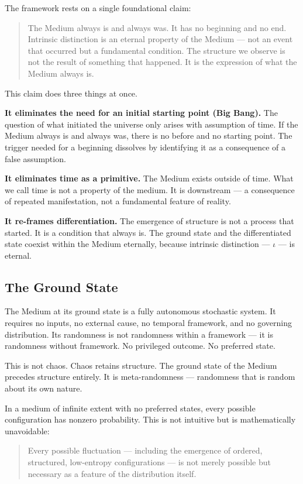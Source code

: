 \documentclass[11pt,letterpaper]{article}
\begin{document}
The framework rests on a single foundational claim:

\begin{quote}
The Medium always is and always was. It has no beginning and no end. Intrinsic distinction is an eternal property of the Medium --- not an event that occurred but a fundamental condition. The structure we observe is not the result of something that happened. It is the expression of what the Medium always is.
\end{quote}

This claim does three things at once.

\textbf{It eliminates the need for an initial starting point (Big Bang).} The question of what initiated the universe only arises with assumption of time. If the Medium always is and always was, there is no before and no starting point. The trigger needed for a beginning dissolves by identifying it as a consequence of a false assumption.

\textbf{It eliminates time as a primitive.} The Medium exists outside of time. What we call time is not a property of the medium. It is downstream --- a consequence of repeated manifestation, not a fundamental feature of reality.

\textbf{It re-frames differentiation.} The emergence of structure is not a process that started. It is a condition that always is. The ground state and the differentiated state coexist within the Medium eternally, because intrinsic distinction --- \(\iota\) --- is eternal.
\subsection{The Ground State}
\label{sec:org7713268}

The Medium at its ground state is a fully autonomous stochastic system. It requires no inputs, no external cause, no temporal framework, and no governing distribution. Its randomness is not randomness within a framework --- it is randomness without framework. No privileged outcome. No preferred state.

This is not chaos. Chaos retains structure. The ground state of the Medium precedes structure entirely. It is meta-randomness --- randomness that is random about its own nature.

In a medium of infinite extent with no preferred states, every possible configuration has nonzero probability. This is not intuitive but is mathematically unavoidable:

\begin{quote}
Every possible fluctuation --- including the emergence of ordered, structured, low-entropy configurations --- is not merely possible but necessary as a feature of the distribution itself.
\end{quote}
\end{document}

